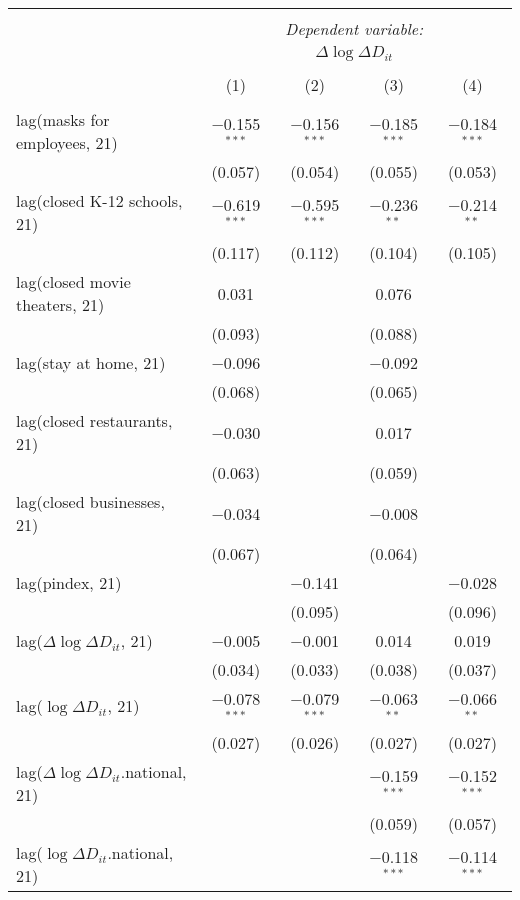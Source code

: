\begin{tabular}{@{\extracolsep{1pt}}lcccc} 
\\[-1.8ex]\hline 
\hline \\[-1.8ex] 
 & \multicolumn{4}{c}{\textit{Dependent variable:}} \\ 
\cline{2-5} 
 & \multicolumn{4}{c}{$\Delta \log \Delta D_{it}$} \\ 
\\[-1.8ex] & (1) & (2) & (3) & (4)\\ 
\hline \\[-1.8ex] 
 lag(masks for employees, 21) & $-$0.155$^{***}$ & $-$0.156$^{***}$ & $-$0.185$^{***}$ & $-$0.184$^{***}$ \\ 
  & (0.057) & (0.054) & (0.055) & (0.053) \\ 
  lag(closed K-12 schools, 21) & $-$0.619$^{***}$ & $-$0.595$^{***}$ & $-$0.236$^{**}$ & $-$0.214$^{**}$ \\ 
  & (0.117) & (0.112) & (0.104) & (0.105) \\ 
  lag(closed movie theaters, 21) & 0.031 &  & 0.076 &  \\ 
  & (0.093) &  & (0.088) &  \\ 
  lag(stay at home, 21) & $-$0.096 &  & $-$0.092 &  \\ 
  & (0.068) &  & (0.065) &  \\ 
  lag(closed restaurants, 21) & $-$0.030 &  & 0.017 &  \\ 
  & (0.063) &  & (0.059) &  \\ 
  lag(closed businesses, 21) & $-$0.034 &  & $-$0.008 &  \\ 
  & (0.067) &  & (0.064) &  \\ 
  lag(pindex, 21) &  & $-$0.141 &  & $-$0.028 \\ 
  &  & (0.095) &  & (0.096) \\ 
  lag($\Delta \log \Delta D_{it}$, 21) & $-$0.005 & $-$0.001 & 0.014 & 0.019 \\ 
  & (0.034) & (0.033) & (0.038) & (0.037) \\ 
  lag($\log \Delta D_{it}$, 21) & $-$0.078$^{***}$ & $-$0.079$^{***}$ & $-$0.063$^{**}$ & $-$0.066$^{**}$ \\ 
  & (0.027) & (0.026) & (0.027) & (0.027) \\ 
  lag($\Delta \log \Delta D_{it}$.national, 21) &  &  & $-$0.159$^{***}$ & $-$0.152$^{***}$ \\ 
  &  &  & (0.059) & (0.057) \\ 
  lag($\log \Delta D_{it}$.national, 21) &  &  & $-$0.118$^{***}$ & $-$0.114$^{***}$ \\ 

\end{tabular}
